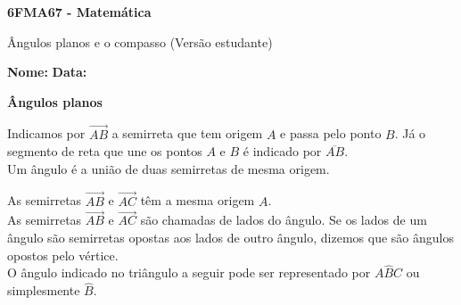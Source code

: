 \documentclass[a4paper,14pt]{article}
\begin{document}
	
	\noindent\textbf{6FMA67 - Matemática} 
	
	\begin{center}Ângulos planos e o compasso (Versão estudante)
	\end{center}
	
	\noindent\textbf{Nome:} \underline{\hspace{10cm}}
	\noindent\textbf{Data:} \underline{\hspace{4cm}}
	
	\begin{multicols}{2}
		\noindent \textbf{Ângulos planos}
		\begin{center}
		\end{center}
		\noindent Indicamos por $\overrightarrow{AB}$ a semirreta que tem origem $A$ e passa pelo ponto $B$. Já o segmento de reta que une os pontos $A$ e $B$ é indicado por $\overline{AB}$. \\
		Um ângulo é a união de duas semirretas de mesma origem.
		\begin{center}
		\end{center}
		As semirretas $\overrightarrow{AB}$ e $\overrightarrow{AC}$ têm a mesma origem $A$. \\
		As semirretas $\overrightarrow{AB}$ e $\overrightarrow{AC}$ são chamadas de lados do ângulo. Se os lados de um ângulo são semirretas opostas aos lados de outro ângulo, dizemos que são ângulos opostos pelo vértice. \\
		O ângulo indicado no triângulo a seguir pode ser representado por $A\hat{B}C$ ou simplesmente $\hat{B}$.
		\begin{center}
\end{center}
\end{multicols}
\end{document}
